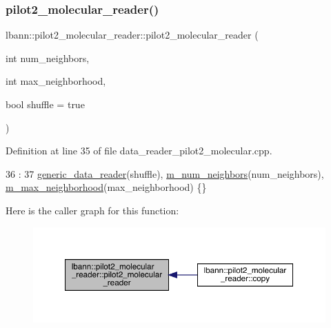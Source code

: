 \subsubsection{\texorpdfstring{pilot2\+\_\+molecular\+\_\+reader()}{pilot2\_molecular\_reader()}\hspace{0.1cm}{\footnotesize\ttfamily [1/2]}}
{\footnotesize\ttfamily lbann\+::pilot2\+\_\+molecular\+\_\+reader\+::pilot2\+\_\+molecular\+\_\+reader (\begin{DoxyParamCaption}\item[{int}]{num\+\_\+neighbors,  }\item[{int}]{max\+\_\+neighborhood,  }\item[{bool}]{shuffle = {\ttfamily true} }\end{DoxyParamCaption})}



Definition at line 35 of file data\+\_\+reader\+\_\+pilot2\+\_\+molecular.\+cpp.


\begin{DoxyCode}
36                                                          :
37   \hyperlink{classlbann_1_1generic__data__reader_aaba933b8f7c1227801f6e80d39986af4}{generic\_data\_reader}(shuffle), \hyperlink{classlbann_1_1pilot2__molecular__reader_aaf41323e4da85467de398b4ab4b58c2c}{m\_num\_neighbors}(num\_neighbors), 
      \hyperlink{classlbann_1_1pilot2__molecular__reader_a0c9e71035cf47191002d1b164d056f50}{m\_max\_neighborhood}(max\_neighborhood) \{\}
\end{DoxyCode}
Here is the caller graph for this function\+:\nopagebreak
\begin{figure}[H]
\begin{center}
\leavevmode
\includegraphics[width=350pt]{classlbann_1_1pilot2__molecular__reader_ac883c7e0fcc935bc6573efa3352275ca_icgraph}
\end{center}
\end{figure}
\mbox{\label{classlbann_1_1pilot2__molecular__reader_a6d74b894fabaf78175684fcc2f747b34}} 
